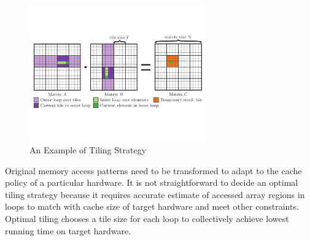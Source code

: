 \begin{figure}[t]
  \vspace{-0.5in}
    \centering
    \includegraphics[width=3in]{3_GEMM_backgrounds/tiling.pdf}
    \vspace{-0.5in}
    \caption{An Example of Tiling Strategy}
    \label{fig:tiling}
\end{figure}

Original memory access patterns need to be transformed to adapt to the cache policy of a particular hardware. It is not straightforward to decide an optimal tiling strategy because it requires accurate estimate of accessed array regions in loops to match with cache size of target hardware and meet other constraints. Optimal tiling chooses a tile size for each loop to collectively achieve lowest running time on target hardware.